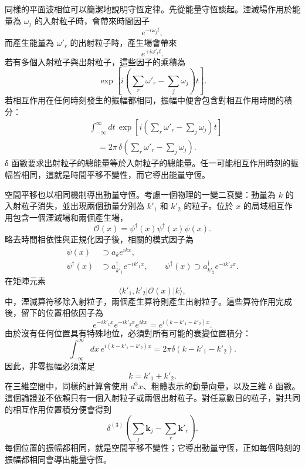同樣的平面波相位可以簡潔地說明守恆定律。先從能量守恆談起。湮滅場作用於能量為 \(\omega_j\) 的入射粒子時，會帶來時間因子
\begin{equation}
e^{-i\omega_j t},
\end{equation}
而產生能量為 \(\omega'_r\) 的出射粒子時，產生場會帶來
\begin{equation}
e^{+i\omega'_r t}.
\end{equation}
若有多個入射粒子與出射粒子，這些因子的乘積為
\begin{equation}
\exp\!\left[
i\left(\sum_r\omega'_r-\sum_j\omega_j\right)t
\right].
\end{equation}
若相互作用在任何時刻發生的振幅都相同，振幅中便會包含對相互作用時間的積分：
\begin{equation}
\begin{aligned}
&\int_{-\infty}^{\infty}dt\,
\exp\!\left[
i\left(\sum_r\omega'_r-\sum_j\omega_j\right)t
\right]
\\
&\quad =2\pi\,
\delta\!\left(\sum_r\omega'_r-\sum_j\omega_j\right).
\end{aligned}
\end{equation}
{\proseunicodefont δ} 函數要求出射粒子的總能量等於入射粒子的總能量。任一可能相互作用時刻的振幅皆相同，這就是時間平移不變性，而它導出能量守恆。

空間平移也以相同機制導出動量守恆。考慮一個物理的一變二衰變：動量為 \(k\) 的入射粒子消失，並出現兩個動量分別為 \(k'_1\) 和 \(k'_2\) 的粒子。位於 \(x\) 的局域相互作用包含一個湮滅場和兩個產生場，
\begin{equation}
\mathcal{O}(x)=\psi^\dagger(x)\psi^\dagger(x)\psi(x).
\end{equation}
略去時間相依性與正規化因子後，相關的模式因子為
\begin{align}
\psi(x)&\supset a_k e^{ikx},
\\
\psi^\dagger(x)&\supset a_{k'_1}^\dagger e^{-ik'_1x},
\qquad
\psi^\dagger(x)\supset a_{k'_2}^\dagger e^{-ik'_2x}.
\end{align}
在矩陣元素
\begin{equation}
\langle k'_1,k'_2|\mathcal{O}(x)|k\rangle,
\end{equation}
中，湮滅算符移除入射粒子，兩個產生算符則產生出射粒子。這些算符作用完成後，留下的位置相依因子為
\begin{equation}
e^{-ik'_1x}e^{-ik'_2x}e^{ikx}
=e^{i(k-k'_1-k'_2)x}.
\end{equation}
由於沒有任何位置具有特殊地位，必須對所有可能的衰變位置積分：
\begin{equation}
\int_{-\infty}^{\infty}dx\,
e^{i(k-k'_1-k'_2)x}
=2\pi\delta(k-k'_1-k'_2).
\end{equation}
因此，非零振幅必須滿足
\begin{equation}
k=k'_1+k'_2.
\end{equation}
在三維空間中，同樣的計算會使用 \(d^3x\)、粗體表示的動量向量，以及三維 {\proseunicodefont δ} 函數。這個論證並不依賴只有一個入射粒子或兩個出射粒子。對任意數目的粒子，對共同的相互作用位置積分便會得到
\begin{equation}
\delta^{(3)}\!\left(
\sum_j\mathbf{k}_j-\sum_r\mathbf{k}'_r
\right).
\end{equation}
每個位置的振幅都相同，就是空間平移不變性；它導出動量守恆，正如每個時刻的振幅都相同會導出能量守恆。

